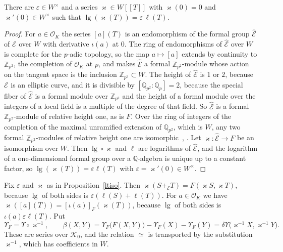 \begin{proposition}\label{ltiso}
There are $\varepsilon\in W^\times$ and a series $\varkappa\in W[[T]]$ with $\varkappa(0)=0$ and $\varkappa'(0)\in W^\times$ such that $\operatorname{lg}(\varkappa(T))=\varepsilon\,\ell(T)$.
\end{proposition}

\begin{proof}
For $a\in\mathcal O_K$ the series $[a](T)$ is an endomorphism of the formal group $\widehat{\mathcal E}$ of $\mathcal E$ over $W$ with derivative $\iota(a)$ at $0$. The ring of endomorphisms of $\widehat{\mathcal E}$ over $W$ is complete for the $p$-adic topology, so the map $a\mapsto[a]$ extends by continuity to $\mathbb Z_{p^2}$, the completion of $\mathcal O_K$ at $p$, and makes $\widehat{\mathcal E}$ a formal $\mathbb Z_{p^2}$-module whose action on the tangent space is the inclusion $\mathbb Z_{p^2}\subset W$. The height of $\widehat{\mathcal E}$ is $1$ or $2$, because $\mathcal E$ is an elliptic curve, and it is divisible by $[\mathbb Q_{p^2}:\mathbb Q_p]=2$, because the special fiber of $\widehat{\mathcal E}$ is a formal module over $\mathbb Z_{p^2}$ and the height of a formal module over the integers of a local field is a multiple of the degree of that field. So $\widehat{\mathcal E}$ is a formal $\mathbb Z_{p^2}$-module of relative height one, as is $F$. Over the ring of integers of the completion of the maximal unramified extension of $\mathbb Q_{p^2}$, which is $W$, any two formal $\mathbb Z_{p^2}$-modules of relative height one are isomorphic~\cite{lubintate}, \cite[Chapter~IV, Section~21]{hazewinkel}. Let $\varkappa\colon\widehat{\mathcal E}\to F$ be an isomorphism over $W$. Then $\operatorname{lg}\circ\varkappa$ and $\ell$ are logarithms of $\widehat{\mathcal E}$, and the logarithm of a one-dimensional formal group over a $\mathbb Q$-algebra is unique up to a constant factor, so $\operatorname{lg}(\varkappa(T))=\varepsilon\ell(T)$ with $\varepsilon=\varkappa'(0)\in W^\times$.
\end{proof}

Fix $\varepsilon$ and $\varkappa$ as in Proposition~\ref{ltiso}. Then $\varkappa(S+_{\mathcal E}T)=F(\varkappa S,\varkappa T)$, because $\operatorname{lg}$ of both sides is $\varepsilon(\ell(S)+\ell(T))$. For $a\in\mathcal O_K$ we have $\varkappa([a](T))=[\iota(a)]_F(\varkappa(T))$, because $\operatorname{lg}$ of both sides is $\iota(a)\varepsilon\ell(T)$. Put
\begin{equation}\label{betadef}
\Upsilon_F=\Upsilon\circ\varkappa^{-1},\qquad\beta(X,Y)=\Upsilon_F\big(F(X,Y)\big)-\Upsilon_F(X)-\Upsilon_F(Y)=\delta\Upsilon\big(\varkappa^{-1}X,\varkappa^{-1}Y\big).
\end{equation}
These are series over $\mathcal K_0$, and the relation $\simeq$ is transported by the substitution $\varkappa^{-1}$, which has coefficients in $W$.

